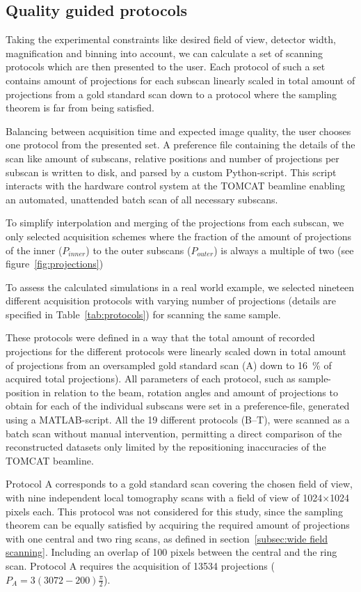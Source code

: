 \subsection{Quality guided protocols}
Taking the experimental constraints like desired field of view, detector width, magnification and binning into account, we can calculate a set of scanning protocols which are then presented to the user. Each protocol of such a set contains amount of projections for each subscan linearly scaled in total amount of projections from a gold standard scan down to a protocol where the sampling theorem is far from being satisfied.

Balancing between acquisition time and expected image quality, the user chooses one protocol from the presented set. A preference file containing the details of the scan like amount of subscans, relative positions and number of projections per subscan is written to disk, and parsed by a custom Python-script. This script interacts with the hardware control system at the TOMCAT beamline enabling an automated, unattended batch scan of all necessary subscans.

To simplify interpolation and merging of the projections from each subscan, we only selected acquisition schemes where the fraction of the amount of projections of the inner ($P_{inner}$) to the outer subscans ($P_{outer}$) is always a multiple of two (see figure~\ref{fig:projections})

To assess the calculated simulations in a real world example, we selected nineteen different acquisition protocols with varying number of projections (details are specified in Table~\ref{tab:protocols}) for scanning the same sample. 

These protocols were defined in a way that the total amount of recorded projections for the different protocols were linearly scaled down in total amount of projections from an oversampled gold standard scan (A) down to \SI{16}{\percent} of acquired total projections). All parameters of each protocol, such as sample-position in relation to the beam, rotation angles and amount of projections to obtain for each of the individual subscans were set in a preference-file, generated using a MATLAB-script. All the 19 different protocols (B--T), were scanned as a batch scan without manual intervention, permitting a direct comparison of the reconstructed datasets only limited by the repositioning inaccuracies of the TOMCAT beamline.

Protocol A corresponds to a gold standard scan covering the chosen field of view, with nine independent local tomography scans with a field of view of 1024$\times$1024 pixels each. This protocol was not considered for this study, since the sampling theorem can be equally satisfied by acquiring the required amount of projections with one central and two ring scans, as defined in section~\ref{subsec:wide field scanning}. Including an overlap of 100 pixels between the central and the ring scan. Protocol A requires the acquisition of 13534 projections ($P_{A}=3(3072-200)\frac{\pi}{2}$).


